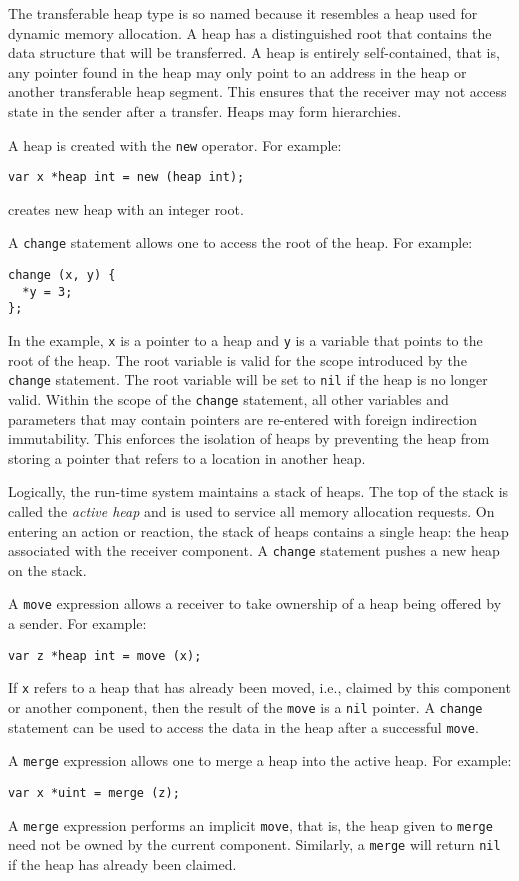 The transferable heap type is so named because it resembles a heap used for dynamic memory allocation.
A heap has a distinguished root that contains the data structure that will be transferred.
A heap is entirely self-contained, that is, any pointer found in the heap may only point to an address in the heap or another transferable heap segment.
This ensures that the receiver may not access state in the sender after a transfer.
Heaps may form hierarchies.

A heap is created with the \verb+new+ operator.
For example:
\begin{verbatim}
var x *heap int = new (heap int);
\end{verbatim}
creates new heap with an integer root.

A \verb+change+ statement allows one to access the root of the heap.
For example:
\begin{verbatim}
change (x, y) {
  *y = 3;
};
\end{verbatim}
In the example, \verb+x+ is a pointer to a heap and \verb+y+ is a variable that points to the root of the heap.
The root variable is valid for the scope introduced by the \verb+change+ statement.
The root variable will be set to \verb+nil+ if the heap is no longer valid.
Within the scope of the \verb+change+ statement, all other variables and parameters that may contain pointers are re-entered with foreign indirection immutability.
This enforces the isolation of heaps by preventing the heap from storing a pointer that refers to a location in another heap.

Logically, the run-time system maintains a stack of heaps.
The top of the stack is called the \emph{active heap} and is used to service all memory allocation requests.
On entering an action or reaction, the stack of heaps contains a single heap:  the heap associated with the receiver component.
A \verb+change+ statement pushes a new heap on the stack.

A \verb+move+ expression allows a receiver to take ownership of a heap being offered by a sender.
For example:
\begin{verbatim}
var z *heap int = move (x);
\end{verbatim}
If \verb+x+ refers to a heap that has already been moved, i.e., claimed by this component or another component, then the result of the \verb+move+ is a \verb+nil+ pointer.
A \verb+change+ statement can be used to access the data in the heap after a successful \verb+move+.

A \verb+merge+ expression allows one to merge a heap into the active heap.
For example:
\begin{verbatim}
var x *uint = merge (z);
\end{verbatim}
A \verb+merge+ expression performs an implicit \verb+move+, that is, the heap given to \verb+merge+ need not be owned by the current component.
Similarly, a \verb+merge+ will return \verb+nil+ if the heap has already been claimed.

